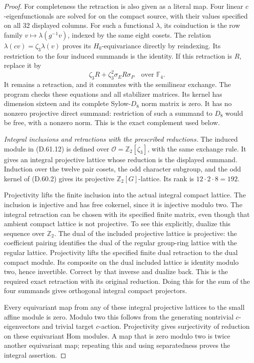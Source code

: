 \begin{proof}
For completeness the retraction is also
given as a literal map. Four linear
\(c\)-eigenfunctionals are solved for
on the compact source, with their values
specified on all 32 displayed columns.
For such a functional \(\lambda\), its
coinduction is the row family
\(v\mapsto\lambda(g^{-1}v)\), indexed
by the same eight cosets. The relation
\(\lambda(cv)=\zeta_3\lambda(v)\)
proves its \(H_0\)-equivariance directly
by reindexing. Its restriction to the
four induced summands is the identity.
If this retraction is \(R\), replace
it by
\[
              \zeta_3R+\zeta_3^2\sigma_E R\sigma_P
                          \quad\text{over }\mathbb F_4.
 \tag{D.61.13}
\]
It remains a retraction, and it commutes
with the semilinear exchange. The
program checks these equations and all
stabilizer matrices. Its kernel has
dimension sixteen and its complete
Sylow-\(D_8\) norm matrix is zero.
It has no nonzero projective direct
summand: restriction of such a summand
to \(D_8\) would be free, with a
nonzero norm. This is the exact
complement used below.

\emph{Integral inclusions and retractions with the prescribed reductions.}
The induced module in (D.61.12) is
defined over \(\mathcal O=\mathbb Z_2[\zeta_3]\),
with the same exchange rule. It gives
an integral projective lattice whose
reduction is the displayed summand.
Induction over the twelve pair cosets,
the odd character subgroup, and the
odd kernel of (D.60.2) gives its
projective \(\mathbb Z_2[G]\)-lattice.
Its rank is \(12\cdot2\cdot8=192\).

Projectivity lifts the finite inclusion
into the actual integral compact lattice.
The inclusion is injective and has free
cokernel, since it is injective modulo
two. The integral retraction can be
chosen with its specified finite matrix,
even though that ambient compact lattice
is not projective. To see this explicitly,
dualize this sequence over \(\mathbb Z_2\).
The dual of the included projective
lattice is projective: the coefficient
pairing identifies the dual of the
regular group-ring lattice with the
regular lattice. Projectivity lifts
the specified finite dual retraction
to the dual compact module. Its
composite on the dual included lattice
is identity modulo two, hence invertible.
Correct by that inverse and dualize
back. This is the required exact
retraction with its original reduction.
Doing this for the sum of the four
summands gives orthogonal integral
compact projectors.

Every equivariant map from any of these
integral projective lattices to the
small affine module is zero. Modulo
two this follows from the generating
nontrivial \(c\)-eigenvectors and
trivial target \(c\)-action. Projectivity
gives surjectivity of reduction on
these equivariant Hom modules. A map
that is zero modulo two is twice
another equivariant map; repeating
this and using separatedness proves
the integral assertion.


\end{proof}
